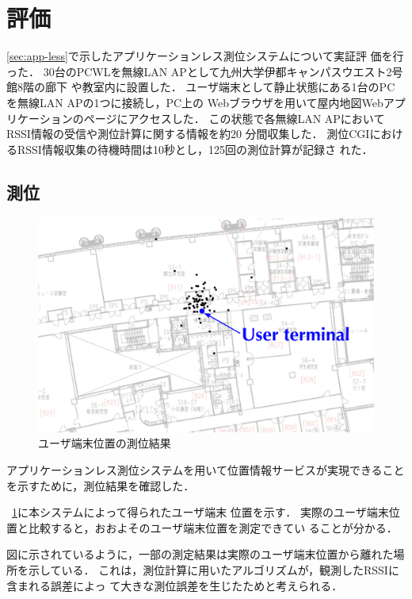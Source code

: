 \documentclass[technicalreport]{ieicej}
\begin{document}
\section{評価}
\label{sec:eval}

\ref{sec:app-less}で示したアプリケーションレス測位システムについて実証評
価を行った．
30台のPCWLを無線LAN APとして九州大学伊都キャンパスウエスト2号館8階の廊下
や教室内に設置した．
ユーザ端末として静止状態にある1台のPCを無線LAN APの1つに接続し，PC上の
Webブラウザを用いて屋内地図Webアプリケーションのページにアクセスした．
この状態で各無線LAN APにおいてRSSI情報の受信や測位計算に関する情報を約20
分間収集した．
測位CGIにおけるRSSI情報収集の待機時間は10秒とし，125回の測位計算が記録さ
れた．

\subsection{測位}

\begin{figure}[bt]
 \centering
 \includegraphics[width=0.8\columnwidth]{figure/positionplot.eps}
 \caption{ユーザ端末位置の測位結果}
 \label{fig:positionplot}
\end{figure}

アプリケーションレス測位システムを用いて位置情報サービスが実現できること
を示すために，測位結果を確認した．

\figurename~\ref{fig:positionplot}に本システムによって得られたユーザ端末
位置を示す．
実際のユーザ端末位置と比較すると，おおよそのユーザ端末位置を測定できてい
ることが分かる．

図に示されているように，一部の測定結果は実際のユーザ端末位置から離れた場
所を示している．
これは，測位計算に用いたアルゴリズムが，観測したRSSIに含まれる誤差によっ
て大きな測位誤差を生じたためと考えられる．
\end{document}
